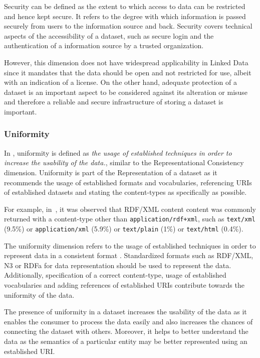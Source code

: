 \begin{definition}[Security]
Security can be defined as the extent to which access to data can be restricted and hence kept secure.
It refers to the degree with which information is passed securely from users to the information source and back. 
Security covers technical aspects of the accessibility of a dataset, such as secure login and the authentication of a information source by a trusted organization.
\end{definition}

However, this dimension does not have widespread applicability in Linked Data since it mandates that the data should be open and not restricted for use, albeit with an indication of a license. 
On the other hand, adequate protection of a dataset is an important aspect to be considered against its alteration or misuse and therefore a reliable and secure infrastructure of storing a dataset is important.

\subsubsection{Uniformity}
In \cite{Flemming}, uniformity is defined as \emph{the usage of established techniques in order to increase the usability of the data.}, similar to the Representational Consistency dimension.
Uniformity is part of the Representation of a dataset as it recommends the usage of established formats and vocabularies, referencing URIs of established datasets and stating the content-types as specifically as possible.

For example, in~\cite{Hogan}, it was observed that RDF/XML content content was commonly returned with a content-type other than \texttt{application/rdf+xml}, such as \texttt{text/xml} (9.5\%) or \texttt{application/xml} (5.9\%) or \texttt{text/plain} (1\%) or \texttt{text/html} (0.4\%).

\begin{definition}[Uniformity]
The uniformity dimension refers to the usage of established techniques in order to represent data in a consistent format . 
Standardized formats such as RDF/XML, N3 or RDFa for data representation should be used to represent the data. 
Additionally, specification of a correct content-type, usage of established vocabularies and adding references of established URIs contribute towards the uniformity of the data. 
\end{definition}

The presence of uniformity in a dataset increases the usability of the data as it enables the consumer to process the data easily and also increases the chances of connecting the dataset with others.
Moreover, it helps to better understand the data as the semantics of a particular entity may be better represented using an established URI.

